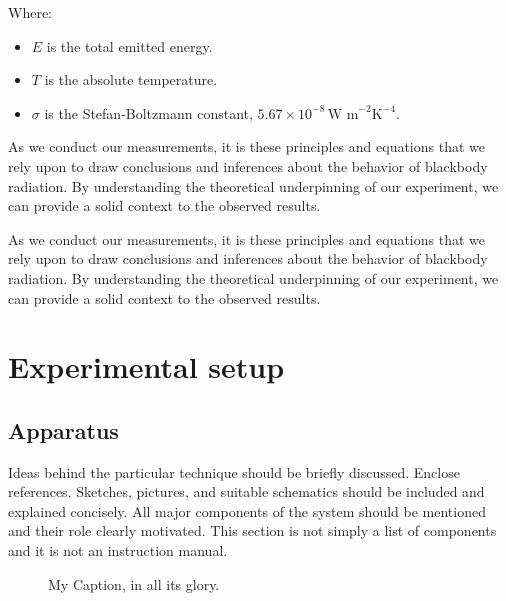\documentclass[10pt,letterpaper,onecolumn]{article}
\begin{document}
Where:
\begin{itemize}
  \item \(E\) is the total emitted energy.
  \item \(T\) is the absolute temperature.
  \item \(\sigma\) is the Stefan-Boltzmann constant, \(5.67 \times 10^{-8} \, \text{W m}^{-2} \text{K}^{-4}\)\cite{stefan_boltzmann}.
\end{itemize}

As we conduct our measurements, it is these principles and equations that we rely upon to draw conclusions and inferences about the behavior of blackbody radiation. By understanding the theoretical underpinning of our experiment, we can provide a solid context to the observed results.


As we conduct our measurements, it is these principles and equations that we rely upon to draw conclusions and inferences about the behavior of blackbody radiation. By understanding the theoretical underpinning of our experiment, we can provide a solid context to the observed results.

\section{Experimental setup}
\subsection{Apparatus}

Ideas behind the particular technique should be briefly
discussed. Enclose references. Sketches, pictures, and
suitable schematics should be included and explained
concisely. All major components of the system should be
mentioned and their role clearly motivated. This section
is not simply a list of components and it is not an
instruction manual. 



\begin{figure}[ht]
 \begin{center}
 \caption{ My Caption, in all its glory.\label{fig:apparatus} }
 \end{center}
\end{figure}
\end{document}
